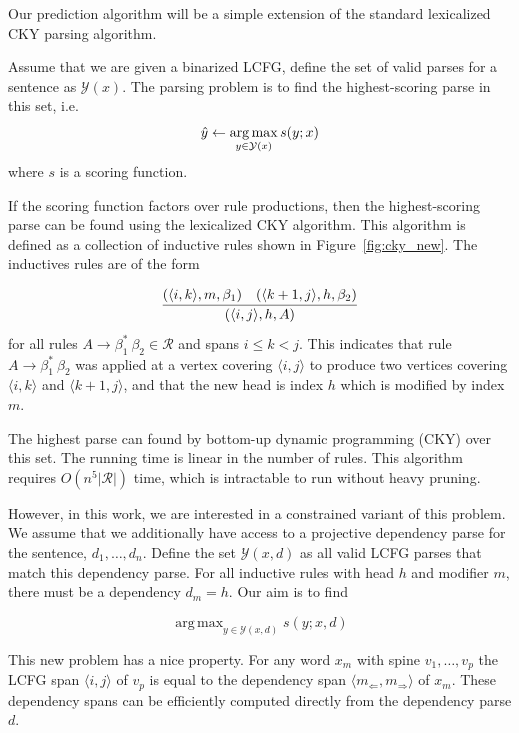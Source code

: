\documentclass[11pt,letterpaper]{article}
\DeclareMathOperator*{\argmax}{arg\,max}
\newcommand{\rules}{\mathcal{R}}
\newcommand{\Left}[1]{#1_{\Leftarrow}}
\newcommand{\Right}[1]{#1_{\Rightarrow}}
\newcommand{\Span}[1]{\langle #1 \rangle}
\newcommand{\Rule}[3]{#1 \rightarrow #2\ #3}
\newcommand{\RuleA}[3]{#1 \rightarrow #2^*\ #3}
\begin{document}

Our prediction algorithm will be a simple extension of the standard lexicalized CKY parsing algorithm.

Assume that we are given a binarized LCFG,
define the set of valid parses for a sentence as $\mathcal{Y}(x)$.
The parsing problem is to find the highest-scoring parse in this set, i.e.  \[ \hat{y} \gets \argmax_{y \in {\cal Y}(x)} s(y;x) \] where
$s$ is a scoring function.

If the scoring function factors over rule productions, then
the highest-scoring parse can be found using the lexicalized
CKY algorithm. This algorithm is defined as a
collection of inductive rules shown in Figure~\ref{fig:cky_new}.
The inductives rules are of the form

\[ \infer{(\Span{i, j}, h, A)}{(\Span{i, k}, m, \beta_1) & (\Span{k+1,
    j}, h, \beta_2)} \] for all rules $\RuleA{A}{\beta_1}{\beta_2}\in
\rules$ and spans $i \leq k < j$. This indicates that
rule $\RuleA{A}{\beta_1}{\beta_2}$ was applied at a vertex covering
$\Span{i, j}$ to produce two vertices covering $\Span{i, k}$ and
$\Span{k+1, j}$, and that the new head is index $h$ which is modified
by index $m$.

 The highest parse can found by bottom-up dynamic programming (CKY)
 over this set. The running time is linear in the
 number of rules. This algorithm requires $O(n^5 |\rules|)$ time, which is intractable to run without heavy pruning.

 However, in this work, we are interested in a constrained variant of
 this problem. We assume that we additionally have access to a
 projective dependency parse for the sentence, $d_1, \ldots, d_n$.
 Define the set $\mathcal{Y}(x,d)$ as all valid LCFG parses that match
 this dependency parse. For all inductive rules with head $h$ and modifier
$m$, there must be a dependency $d_m = h$.  Our aim is to find

\[ \argmax_{y \in \mathcal{Y}(x, d)} s(y; x, d)\]

This new problem has a nice property. For any word $x_m$ with spine $v_1, \ldots, v_p$ the LCFG span  $\Span{i,j}$ of $v_p$ is equal to the dependency span $\Span{\Left{m},\Right{m}}$ of $x_m$. These dependency spans can be efficiently computed directly from the dependency parse $d$.
\end{document}
